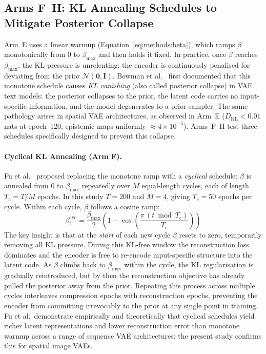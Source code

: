 \documentclass[12pt, a4paper, twoside, openright]{book}
\begin{document}
\subsection{Arms F--H: KL Annealing Schedules to Mitigate Posterior Collapse}
\label{sec:methods:kl:schedules}

Arm~E uses a linear warmup (Equation~\ref{eq:methods:beta}), which ramps $\beta$ monotonically from 0 to $\beta_{\max}$ and then holds it fixed. In practice, once $\beta$ reaches $\beta_{\max}$, the KL pressure is unrelenting: the encoder is continuously penalised for deviating from the prior $\mathcal{N}(\mathbf{0},\mathbf{I})$. Bowman et al.~\cite{bowman_generating_2016} first documented that this monotone schedule causes \emph{KL vanishing} (also called posterior collapse) in VAE text models: the posterior collapses to the prior, the latent code carries no input-specific information, and the model degenerates to a prior-sampler. The same pathology arises in spatial VAE architectures, as observed in Arm~E ($D_{\mathrm{KL}} < 0.01$ nats at epoch~120, epistemic maps uniformly $\approx 4 \times 10^{-5}$). Arms~F--H test three schedules specifically designed to prevent this collapse.

\paragraph{Cyclical KL Annealing (Arm F).}
Fu et al.~\cite{fu_cyclical_2019} proposed replacing the monotone ramp with a \emph{cyclical} schedule: $\beta$ is annealed from 0 to $\beta_{\max}$ repeatedly over $M$ equal-length cycles, each of length $T_c = T/M$ epochs. In this study $T = 200$ and $M = 4$, giving $T_c = 50$ epochs per cycle. Within each cycle, $\beta$ follows a cosine ramp:
\begin{equation}
\label{eq:methods:beta:cyclic}
\beta_t^{\mathrm{cyc}} = \frac{\beta_{\max}}{2}
  \left(1 - \cos\!\left(\frac{\pi\,(t \bmod T_c)}{T_c}\right)\right)
\end{equation}
The key insight is that at the \emph{start} of each new cycle $\beta$ resets to zero, temporarily removing all KL pressure. During this KL-free window the reconstruction loss dominates and the encoder is free to re-encode input-specific structure into the latent code. As $\beta$ climbs back to $\beta_{\max}$ within the cycle, the KL regularisation is gradually reintroduced, but by then the reconstruction objective has already pulled the posterior away from the prior. Repeating this process across multiple cycles interleaves compression epochs with reconstruction epochs, preventing the encoder from committing irrevocably to the prior at any single point in training. Fu et al.\ demonstrate empirically and theoretically that cyclical schedules yield richer latent representations and lower reconstruction error than monotone warmup across a range of sequence VAE architectures; the present study confirms this for spatial image VAEs.
\end{document}
